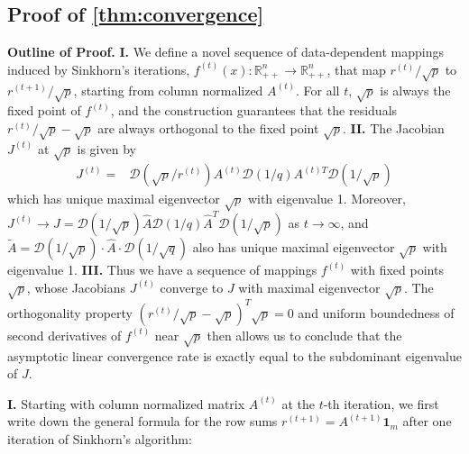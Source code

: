 \subsection{Proof of \cref{thm:convergence}}
 \textbf{Outline of Proof.} \textbf{I.} We define a novel sequence of data-dependent mappings induced
by Sinkhorn's iterations, $f^{(t)}(x):\mathbb{R}_{++}^{n}\rightarrow\mathbb{R}_{++}^{n}$,
that map $r^{(t)}/\sqrt{p}$ to $r^{(t+1)}/\sqrt{p}$, starting from
column normalized $A^{(t)}$. For all $t$, $\sqrt{p}$ is always
the fixed point of $f^{(t)}$, and the construction guarantees that
the residuals $r^{(t)}/\sqrt{p}-\sqrt{p}$ are always orthogonal to
the fixed point $\sqrt{p}$. \textbf{II.} The Jacobian $J^{(t)}$ at $\sqrt{p}$ is given by
\begin{align*}
J^{(t)}= & \mathcal{D}(\sqrt{p}/r^{(t)})A^{(t)}\mathcal{D}(1/q)A^{(t)T}\mathcal{D}(1/\sqrt{p})
\end{align*}
 which has unique maximal eigenvector $\sqrt{p}$ with eigenvalue
1. Moreover, $J^{(t)}\rightarrow J=\mathcal{D}(1/\sqrt{p})\hat{A}\mathcal{D}(1/q)\hat{A}^{T}\mathcal{D}(1/\sqrt{p})$
as $t\rightarrow\infty$, and $\tilde{A}=\mathcal{D}(1/\sqrt{p})\cdot\hat{A}\cdot\mathcal{D}(1/\sqrt{q})$ also has unique maximal
eigenvector $\sqrt{p}$ with eigenvalue 1. \textbf{III.} Thus we have a sequence of mappings $f^{(t)}$ with
fixed points $\sqrt{p}$, whose Jacobians $J^{(t)}$ converge to $J$
with maximal eigenvector $\sqrt{p}$. The orthogonality property $(r^{(t)}/\sqrt{p}-\sqrt{p})^{T}\sqrt{p}=0$
and uniform boundedness of second derivatives of $f^{(t)}$ near $\sqrt{p}$
then allows us to conclude that the asymptotic linear convergence rate is exactly
equal to the subdominant eigenvalue of $J$.

\textbf{I.} Starting with column normalized matrix $A^{(t)}$ at the
$t$-th iteration, we first write down the general formula for the
row sums $r^{(t+1)}=A^{(t+1)}\mathbf{1}_{m}$ after one iteration
of Sinkhorn's algorithm:

